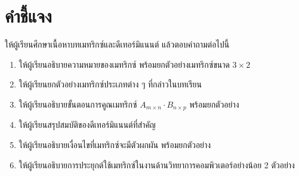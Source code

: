\section*{คำชี้แจง} ให้ผู้เรียนศึกษาเนื้อหาบทเมทริกซ์และดีเทอร์มิแนนต์ แล้วตอบคำถามต่อไปนี้
\begin{enumerate}
    \item ให้ผู้เรียนอธิบายความหมายของเมทริกซ์ พร้อมยกตัวอย่างเมทริกซ์ขนาด $3 \times 2$
    \item ให้ผู้เรียนยกตัวอย่างเมทริกซ์ประเภทต่าง ๆ ที่กล่าวในบทเรียน
    \item ให้ผู้เรียนอธิบายขั้นตอนการคูณเมทริกซ์ $A_{m \times n} \cdot B_{n \times p}$ พร้อมยกตัวอย่าง
    \item ให้ผู้เรียนสรุปสมบัติของดีเทอร์มิแนนต์ที่สำคัญ
    \item ให้ผู้เรียนอธิบายเงื่อนไขที่เมทริกซ์จะมีตัวผกผัน พร้อมยกตัวอย่าง
    \item ให้ผู้เรียนอธิบายการประยุกต์ใช้เมทริกซ์ในงานด้านวิทยาการคอมพิวเตอร์อย่างน้อย 2 ตัวอย่าง
\end{enumerate}
